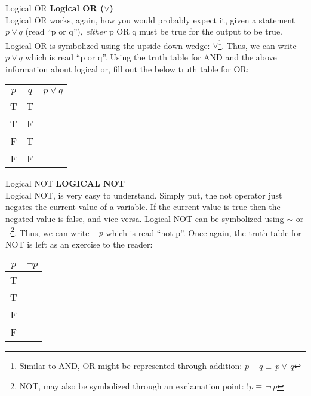 \begin{definition}{Logical OR}{}
  \large\textbf{Logical OR ($\lor$)} \\
  \normalsize Logical OR works, again, how you would probably expect it, given a statement $p \lor q$ (read ``p or q''), \textit{either} p OR q must be true for the output to be true. Logical OR is symbolized using the upside-down wedge: $\lor$\footnote{Similar to AND, OR might be represented through addition: $p+q\equiv\,p\lor\,q$}. Thus, we can write $p \lor q$ which is read ``p or q''. Using the truth table for AND and the above information about logical or, fill out the below truth table for OR:
  \vspace{0.01in}
  \begin{center}
    \begin{tabular}{ |c|c|c| } 
      \hline
      $p$ & $q$ & $p \lor q$ \\ 
      \hline
      T & T &   \\ 
      T & F &   \\ 
      F & T &   \\ 
      F & F &   \\ 
      \hline
    \end{tabular}
  \end{center}
  \vspace{0.01in}
\end{definition}

\newpage 


\begin{definition}{Logical NOT}{}
\large \textbf{LOGICAL NOT} \\ 
  \normalsize Logical NOT, is very easy to understand. Simply put, the not operator just negates the current value of a variable. If the current value is true then the negated value is false, and vice versa. Logical NOT can be symbolized using $\sim$ or $\lnot$\footnote{NOT, may also be symbolized through an exclamation point: $!p\equiv\,\lnot\,p$}. Thus, we can write $\lnot\,p$ which is read ``not p''. Once again, the truth table for NOT is left as an exercise to the reader:
  \vspace{0.01in}
  \begin{center}
    \begin{tabular}{ |c|c| } 
      \hline
      $p$ & $\lnot p$ \\ 
      \hline
      T &  \\ 
      T &  \\ 
      F &  \\ 
      F &  \\ 
      \hline
    \end{tabular}
  \end{center}
  \vspace{0.01in}
\end{definition}

